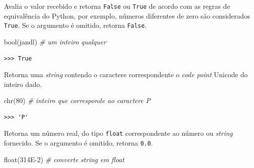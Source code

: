 \documentclass[
]{book}
\newenvironment{Shaded}{\begin{snugshade}}{\end{snugshade}}
\newcommand{\BuiltInTok}[1]{#1}
\newcommand{\CommentTok}[1]{\textcolor[rgb]{0.56,0.35,0.01}{\textit{#1}}}
\newcommand{\DecValTok}[1]{\textcolor[rgb]{0.00,0.00,0.81}{#1}}
\newcommand{\NormalTok}[1]{#1}
\newcommand{\StringTok}[1]{\textcolor[rgb]{0.31,0.60,0.02}{#1}}
\providecommand{\tightlist}{%
  \setlength{\itemsep}{0pt}\setlength{\parskip}{0pt}}
\begin{document}
\begin{description}
\tightlist
\item[\texttt{bool(x)}]
Avalia o valor recebido e retorna \texttt{False} ou \texttt{True} de acordo com as regras de equivalência do Python, por exemplo, números diferentes de zero são considerados \texttt{True}. Se o argumento é omitido, retorna \texttt{False}.
\end{description}

\begin{Shaded}
\begin{Highlighting}[]
\BuiltInTok{bool}\NormalTok{(}\StringTok{\textquotesingle{}jandl\textquotesingle{}}\NormalTok{) }\CommentTok{\# um inteiro qualquer}
\end{Highlighting}
\end{Shaded}

\begin{verbatim}
>>> True
\end{verbatim}

\begin{description}
\tightlist
\item[\texttt{chr(x)}]
Retorna uma \emph{string} contendo o caractere correspondente o \emph{code point} Unicode do inteiro dado.
\end{description}

\begin{Shaded}
\begin{Highlighting}[]
\BuiltInTok{chr}\NormalTok{(}\DecValTok{80}\NormalTok{) }\CommentTok{\# inteiro que corresponde ao caractere \textquotesingle{}P\textquotesingle{}}
\end{Highlighting}
\end{Shaded}

\begin{verbatim}
>>> 'P'
\end{verbatim}

\begin{description}
\tightlist
\item[\texttt{float(x)}]
Retorna um número real, do tipo \texttt{float} correspondente ao número ou \emph{string} fornecido. Se o argumento é omitido, retorna \texttt{0.0}.
\end{description}

\begin{Shaded}
\begin{Highlighting}[]
\BuiltInTok{float}\NormalTok{(}\StringTok{\textquotesingle{}314E{-}2\textquotesingle{}}\NormalTok{) }\CommentTok{\# converte string em float}
\end{Highlighting}
\end{Shaded}
\end{document}
